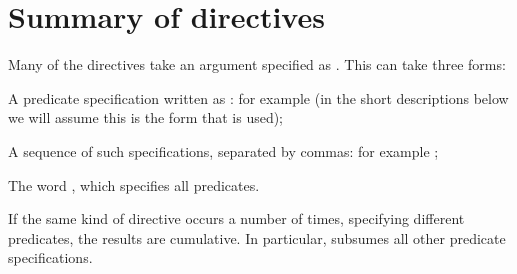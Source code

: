 \chapter*{Summary of directives\label{directives}}%


Many of the directives take an argument specified as .  This can
take three forms:
\begin{LightEnumerate}
\item
  A predicate specification written as : for example
   (in the short descriptions below we will assume this is the form
  that is used);
\item
  A sequence of such specifications, separated by commas: for example
  ;
\item
  The word , which specifies all predicates.
\end{LightEnumerate}
If the same kind of directive occurs a number of times, specifying different
predicates, the results are cumulative.  In particular,  subsumes all
other predicate specifications.

